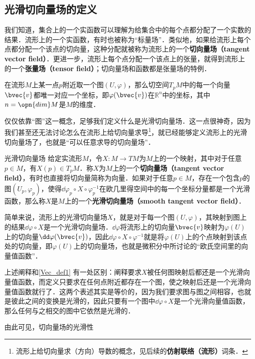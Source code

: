 
\subsection{光滑切向量场的定义}

我们知道，集合上的一个实函数可以理解为给集合中的每个点都分配了一个实数的结果．流形上的一个实函数，有时也被称为“标量场”．类似地，如果给流形上每个点都分配一个该点的切向量，这种分配就被称为流形上的一个\textbf{切向量场（tangent vector field）}．更进一步，流形上每个点分配一个该点上的张量，就得到流形上的一个\textbf{张量场（tensor field）}；切向量场和函数都是张量场的特例．


在流形$M$上某一点$p$附近取一个图$(U, \varphi)$，那么切空间$T_pM$中的每一个向量$\bvec{v}$都唯一对应一个坐标，即$\varphi(\bvec{v})$在$\mathbb{R}^n$中的坐标，其中$n=\opn{dim}M$是$M$的维度．

仅仅依靠“图”这一概念，足够我们定义什么是光滑切向量场．这一点很神奇，因为我们甚至还无法讨论怎么在流形上给切向量求导\footnote{流形上给切向量求（方向）导数的概念，见后续的\textbf{仿射联络（流形）}词条．}，就已经能够定义流形上的光滑切向量场了，也就是“可以任意求导的切向量场”．

\begin{definition}{光滑切向量场}\label{Vec_def1}
给定实流形$M$，令$X:M\to TM$为$M$上的一个映射，其中对于任意$p\in M$，有$X(p)\in T_pM$．称$X$为$M$上的一个\textbf{切向量场（tangent vector field）}，有时也直接将切向量简称为向量．如果对于任意$p\in M$，存在一个包含$p$的图$(U_p, \varphi_p)$，使得$\dd\varphi_p\circ X\circ\varphi_p^{-1}$在欧几里得空间中的每一个坐标分量都是一个光滑函数，那么称$X$是$M$上的一个\textbf{光滑切向量场（smooth tangent vector field）}．
\end{definition}

简单来说，流形上的光滑切向量场$X$，就是对于每一个图$(U, \varphi)$，其映射到图上的结果$\dd\varphi\circ X$是一个光滑切向量场．$\dd\varphi$将流形上的切向量$\bvec{v}$映射为$\varphi(U)$上的切向量$\dd\varphi(\bvec{v})$，因此$\dd\varphi\circ X\circ\varphi^{-1}$就是将$\varphi(U)$上的个点映射到该点处的切向量，即$\varphi(U)$上的切向量场，也就是微积分中所讨论的“欧氏空间里的向量值函数”．

上述阐释和\autoref{Vec_def1} 有一处区别：阐释要求$X$被任何图映射后都还是一个光滑向量值函数，而定义只要求在任何点附近都存在一个图，使之映射后还是一个光滑向量值函数就行了．这两个表述其实是等价的，因为我们要求图与图之间相容，也就是彼此之间的变换是光滑的，因此只要有一个图中$\dd\varphi\circ X$是一个光滑向量值函数，那么任何与之相交的图中它依然是光滑的．

由此可见，切向量场的光滑性





